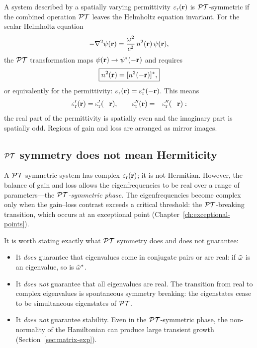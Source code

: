 A system described by a spatially varying permittivity $\varepsilon_{\mathrm{r}}(\mathbf{r})$ is
$\mathcal{PT}$-symmetric if the combined operation $\mathcal{PT}$ leaves the Helmholtz
equation invariant. For the scalar Helmholtz equation
\begin{equation}
 -\nabla^2\psi(\mathbf{r}) = \frac{\omega^2}{c^2}\,n^2(\mathbf{r})\,\psi(\mathbf{r}),
 \label{eq:helmholtz-scalar}
\end{equation}
the $\mathcal{PT}$ transformation maps $\psi(\mathbf{r}) \to \psi^*(-\mathbf{r})$ and requires
\begin{equation}
 \boxed{n^2(\mathbf{r}) = [n^2(-\mathbf{r})]^*,}
 \label{eq:pt-n-condition}
\end{equation}
or equivalently for the permittivity:
$\varepsilon_{\mathrm{r}}(\mathbf{r}) = \varepsilon_{\mathrm{r}}^*(-\mathbf{r})$. This means
\begin{equation}
 \varepsilon_{\mathrm{r}}'(\mathbf{r}) = \varepsilon_{\mathrm{r}}'(-\mathbf{r}), \qquad
 \varepsilon_{\mathrm{r}}''(\mathbf{r}) = -\varepsilon_{\mathrm{r}}''(-\mathbf{r}):
 \label{eq:pt-eps-parts}
\end{equation}
the real part of the permittivity is spatially even and the imaginary part
is spatially odd. Regions of gain and loss are arranged as mirror images.

\subsection{$\mathcal{PT}$ symmetry does not mean Hermiticity}
\label{ssec:pt-not-hermitian}

A $\mathcal{PT}$-symmetric system has complex $\varepsilon_{\mathrm{r}}(\mathbf{r})$; it is not Hermitian.
However, the balance of gain and loss allows the eigenfrequencies to be
real over a range of parameters---the \emph{$\mathcal{PT}$-symmetric phase}. The
eigenfrequencies become complex only when the gain--loss contrast exceeds
a critical threshold: the $\mathcal{PT}$-breaking transition, which occurs at an
exceptional point (Chapter~\ref{ch:exceptional-points}).

It is worth stating exactly what $\mathcal{PT}$ symmetry does and does not
guarantee:
\begin{itemize}
 \item It \emph{does} guarantee that eigenvalues come in conjugate
 pairs or are real: if $\tilde{\omega}$ is an eigenvalue, so is $\tilde{\omega}^*$.
 \item It \emph{does not} guarantee that all eigenvalues are real.
 The transition from real to complex eigenvalues is spontaneous
 symmetry breaking: the eigenstates cease to be simultaneous
 eigenstates of $\mathcal{PT}$.
 \item It \emph{does not} guarantee stability. Even in the
 $\mathcal{PT}$-symmetric phase, the non-normality of the Hamiltonian can
 produce large transient growth
 (Section~\ref{sec:matrix-exp}).
\end{itemize}

